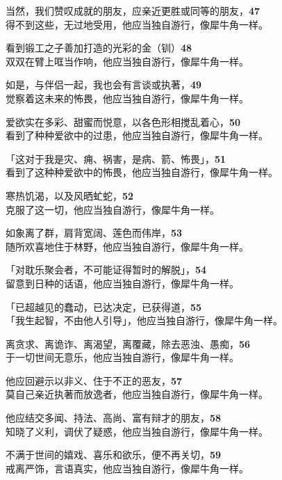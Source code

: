 当然，我们赞叹成就的朋友，应亲近更胜或同等的朋友，\hfill{\grayfootnotesize \textbf{47}} \\
得不到这些，无过地受用，他应当独自游行，像犀牛角一样。


看到锻工之子善加打造的光彩的金（钏）\hfill{\grayfootnotesize \textbf{48}} \\
双双在臂上哐当作响，他应当独自游行，像犀牛角一样。


如是，与伴侣一起，我也会有言谈或执著，\hfill{\grayfootnotesize \textbf{49}} \\
觉察着这未来的怖畏，他应当独自游行，像犀牛角一样。


爱欲实在多彩、甜蜜而悦意，以各色形相搅乱着心，\hfill{\grayfootnotesize \textbf{50}} \\
看到了种种爱欲中的过患，他应当独自游行，像犀牛角一样。


「这对于我是灾、痈、祸害，是病、箭、怖畏」，\hfill{\grayfootnotesize \textbf{51}} \\
看到了这种种爱欲中的怖畏，他应当独自游行，像犀牛角一样。


寒热饥渴，以及风晒虻蛇，\hfill{\grayfootnotesize \textbf{52}} \\
克服了这一切，他应当独自游行，像犀牛角一样。


如象离了群，肩背宽阔、莲色而伟岸，\hfill{\grayfootnotesize \textbf{53}} \\
随所欢喜地住于林野，他应当独自游行，像犀牛角一样。


「对耽乐聚会者，不可能证得暂时的解脱」，\hfill{\grayfootnotesize \textbf{54}} \\
留意到日种的话语，他应当独自游行，像犀牛角一样。


「已超越见的蠢动，已达决定，已获得道，\hfill{\grayfootnotesize \textbf{55}} \\
「我生起智，不由他人引导」，他应当独自游行，像犀牛角一样。


离贪求、离诡诈、离渴望，离覆藏，除去恶浊、愚痴，\hfill{\grayfootnotesize \textbf{56}} \\
于一切世间无意乐，他应当独自游行，像犀牛角一样。


他应回避示以非义、住于不正的恶友，\hfill{\grayfootnotesize \textbf{57}} \\
莫自己亲近执著而放逸者，他应当独自游行，像犀牛角一样。


他应结交多闻、持法、高尚、富有辩才的朋友，\hfill{\grayfootnotesize \textbf{58}} \\
知晓了义利，调伏了疑惑，他应当独自游行，像犀牛角一样。


不满于世间的嬉戏、喜乐和欲乐，便不再关切，\hfill{\grayfootnotesize \textbf{59}} \\
戒离严饰，言语真实，他应当独自游行，像犀牛角一样。


